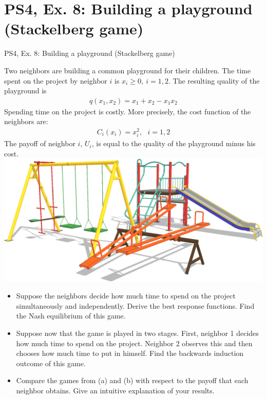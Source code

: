 \section{PS4, Ex. 8: Building a playground (Stackelberg game)}

\begin{frame}{PS4, Ex. 8: Building a playground (Stackelberg game)}
  \begin{multicols}{2}
    Two neighbors are building a common playground for their children. The time spent on the project by neighbor $i$ is $x_i \geq 0,\ i = 1, 2$. The resulting quality of the playground is
    \begin{align*}
      q(x_1,x_2)=x_1+x_2-x_1x_2
    \end{align*}
    Spending time on the project is costly. More precisely, the cost function of the neighbors are:
    \begin{align*}
      C_i(x_i)=x_i^2,\ \ \ i=1,2
    \end{align*}
    The payoff of neighbor $i$, $U_i$, is equal to the quality of the playground minus his cost.
    \includegraphics[width=\columnwidth]{figures/playground}
  \vfill\null \columnbreak
    \begin{itemize}
      \item[(a)] Suppose the neighbors decide how much time to spend on the project simultaneously and independently. Derive the best response functions. Find the Nash equilibrium of this game.
      \item[(b)] Suppose now that the game is played in two stages. First, neighbor 1 decides how much time to spend on the project. Neighbor 2 observes this and then chooses how much time to put in himself. Find the backwards induction outcome of this game.
      \item[(c)] Compare the games from (a) and (b) with respect to the payoff that each neighbor obtains. Give an intuitive explanation of your results.
    \end{itemize}
  \vfill\null
  \end{multicols}
\end{frame}

